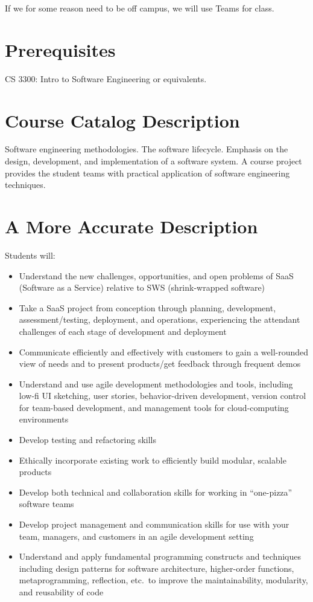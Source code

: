 \documentclass[11pt]{article}
\begin{document}
If we for some reason need to be off campus, we will use Teams for class.

\section*{Prerequisites}

CS 3300: Intro to Software Engineering or equivalents.

\section*{Course Catalog Description}

Software engineering methodologies. The software lifecycle. Emphasis on the design, development, and implementation of a software system. A course project provides the student teams with practical application of software engineering techniques.

\section*{A More Accurate Description}

Students will:
\begin{itemize}
    \item Understand the new challenges, opportunities, and open problems of SaaS (Software as a Service) relative to SWS (shrink-wrapped software)
    \item Take a SaaS project from conception through planning, development, assessment/testing, deployment, and operations, experiencing the attendant challenges of each stage of development and deployment
    \item Communicate efficiently and effectively with customers to gain a well-rounded view of needs and to present products/get feedback through frequent demos
    \item Understand and use agile development methodologies and tools, including low-fi UI sketching, user stories, behavior-driven development, version control for team-based development, and management tools for cloud-computing environments
    \item Develop testing and refactoring skills
    \item Ethically incorporate existing work to efficiently build modular, scalable products
    \item Develop both technical and collaboration skills for working in ``one-pizza'' software teams
    \item Develop project management and communication skills for use with your team, managers, and customers in an agile development setting
    \item Understand and apply fundamental programming constructs and techniques including design patterns for software architecture, higher-order functions, metaprogramming, reflection, etc.\ to improve the maintainability, modularity, and reusability of code
\end{itemize}
\end{document}
